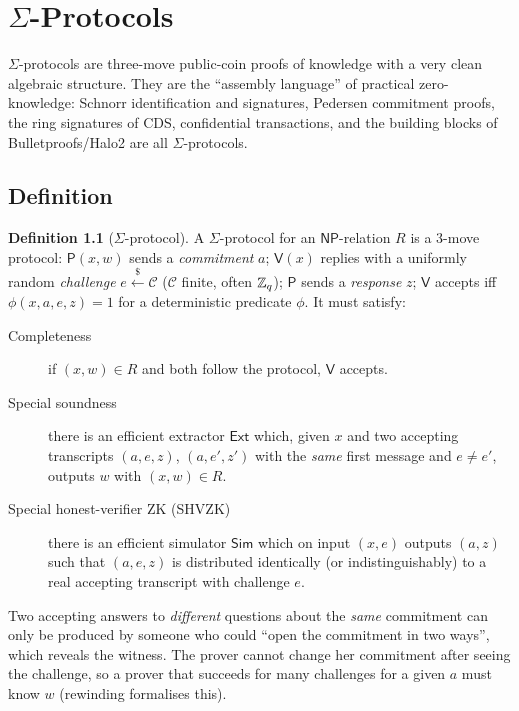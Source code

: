 \documentclass[11pt,a4paper]{report}
\theoremstyle{plain}
\theoremstyle{definition}
\newtheorem{definition}[theorem]{Definition}
\theoremstyle{remark}
\newcommand{\getsr}{\xleftarrow{\$}}
\newcommand{\Prv}{\mathsf{P}}\newcommand{\Ver}{\mathsf{V}}
\newcommand{\Sim}{\mathsf{Sim}}\newcommand{\Ext}{\mathsf{Ext}}
\newcommand{\NP}{\mathsf{NP}}\newcommand{\BPP}{\mathsf{BPP}}\newcommand{\IP}{\mathsf{IP}}
\begin{document}
\chapter{\texorpdfstring{$\Sigma$}{Sigma}-Protocols}
\label{ch:sigma}
$\Sigma$-protocols are three-move public-coin proofs of knowledge with a very clean algebraic structure. They are the ``assembly language'' of practical zero-knowledge: Schnorr identification and signatures, Pedersen commitment proofs, the ring signatures of CDS, confidential transactions, and the building blocks of Bulletproofs/Halo2 are all $\Sigma$-protocols.

\section{Definition}
\begin{definition}[$\Sigma$-protocol]\label{def:sigma}
A $\Sigma$-protocol for an $\NP$-relation $R$ is a 3-move protocol: $\Prv(x,w)$ sends a \emph{commitment} $a$; $\Ver(x)$ replies with a uniformly random \emph{challenge} $e\getsr\mathcal C$ ($\mathcal C$ finite, often $\mathbb{Z}_q$); $\Prv$ sends a \emph{response} $z$; $\Ver$ accepts iff $\phi(x,a,e,z)=1$ for a deterministic predicate $\phi$. It must satisfy:
\begin{description}
\item[Completeness] if $(x,w)\in R$ and both follow the protocol, $\Ver$ accepts.
\item[Special soundness] there is an efficient extractor $\Ext$ which, given $x$ and two accepting transcripts $(a,e,z)$, $(a,e',z')$ with the \emph{same} first message and $e\ne e'$, outputs $w$ with $(x,w)\in R$.
\item[Special honest-verifier ZK (SHVZK)] there is an efficient simulator $\Sim$ which on input $(x,e)$ outputs $(a,z)$ such that $(a,e,z)$ is distributed identically (or indistinguishably) to a real accepting transcript with challenge $e$.
\end{description}
\end{definition}
\begin{center}
\end{center}
\begin{intuition}
Two accepting answers to \emph{different} questions about the \emph{same} commitment can only be produced by someone who could ``open the commitment in two ways'', which reveals the witness. The prover cannot change her commitment after seeing the challenge, so a prover that succeeds for many challenges for a given $a$ must know $w$ (rewinding formalises this).
\end{intuition}
\end{document}
